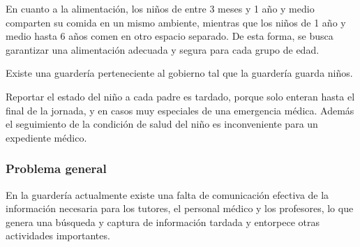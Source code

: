 \documentclass{article}
\begin{document}
En cuanto a la alimentación, los niños de entre 3 meses y 1 año y medio comparten su comida en un mismo ambiente, mientras que los niños de 1 año y medio hasta 6 años comen en otro espacio separado. De esta forma, se busca garantizar una alimentación adecuada y segura para cada grupo de edad.

Existe una guardería perteneciente al gobierno tal que la guardería guarda niños.

Reportar el estado del niño a cada padre es tardado, porque solo enteran hasta el final de la jornada, y en casos muy especiales de una emergencia médica. Además el seguimiento de la condición de salud del niño es inconveniente para un expediente médico.
\subsubsection*{Problema general}

En la guardería actualmente existe una falta de comunicación efectiva de la información necesaria para los tutores, el personal médico y los profesores, lo que genera una búsqueda y captura de información tardada y entorpece otras actividades importantes.
\end{document}
